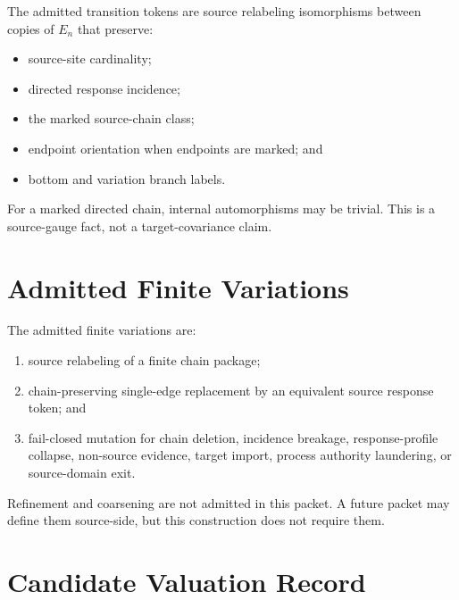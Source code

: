 \documentclass[11pt]{article}
\newcommand{\En}{E_n}
\begin{document}
The admitted transition tokens are source relabeling isomorphisms between
copies of \(\En\) that preserve:
\begin{itemize}[leftmargin=*]
  \item source-site cardinality;
  \item directed response incidence;
  \item the marked source-chain class;
  \item endpoint orientation when endpoints are marked; and
  \item bottom and variation branch labels.
\end{itemize}

For a marked directed chain, internal automorphisms may be trivial. This is a
source-gauge fact, not a target-covariance claim.

\section{Admitted Finite Variations}

The admitted finite variations are:
\begin{enumerate}[leftmargin=*]
  \item source relabeling of a finite chain package;
  \item chain-preserving single-edge replacement by an equivalent source
  response token; and
  \item fail-closed mutation for chain deletion, incidence breakage,
  response-profile collapse, non-source evidence, target import, process
  authority laundering, or source-domain exit.
\end{enumerate}

Refinement and coarsening are not admitted in this packet. A future packet may
define them source-side, but this construction does not require them.

\section{Candidate Valuation Record}
\end{document}
